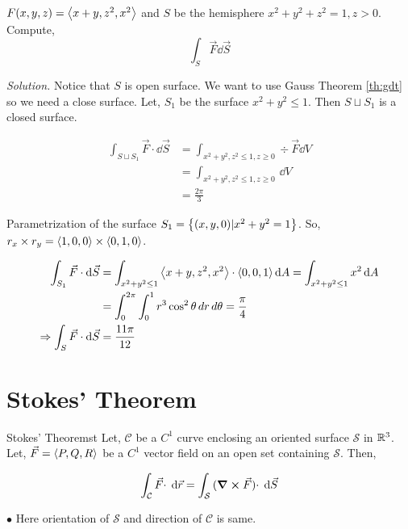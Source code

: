 \documentclass[../Analysis-3]{subfiles}
\begin{document}
\begin{Eg}{}{}
    $F (x,y,z) = \left\langle {x+y}, {z^2,x^2} \right\rangle$ and $S$ be the hemisphere $x^2+y^2+z^2 = 1, z>0$. Compute,
    \[\int_{S} \vec{F} \dd \vec{S}\]

    \textit{Solution.} Notice that $S$ is open surface. We want to  use Gauss Theorem \ref{th:gdt} so we need a close surface. Let, $S_1$ be the surface $x^2 +y^2 \le 1$. Then $S \sqcup S_1$ is a closed surface.

    \begin{align*}
        \int_{S \sqcup S_1} \vec{F}\cdot \dd \vec{S} & = \int_{x^2+y^2,z^2 \le 1, z \ge 0} \div \vec{F} \dd{V} \\
                                                     & = \int_{x^2+y^2,z^2 \le 1, z \ge 0}\,\dd{V}             \\
                                                     & = \frac{2\pi}{3}
    \end{align*}

    Parametrization of the surface $S_1 =\qty{(x,y,0) | x^2+y^2 = 1}$. So, $r_x \times r_y = \left\langle {1,0}, {0} \right\rangle \times \left\langle {0,1}, {0} \right\rangle$.

    \begin{align*}
        \int_{S_1} \vec{F} \cdot \dd \vec{S}           & = \int_{x^2+y^2 \le 1} \left\langle {x+y}, {z^2,x^2} \right\rangle \cdot \left\langle {0,0}, {1} \right\rangle \dd{A} = \int_{x^2+y^2 \le 1} x^2 \dd{A} \\
                                                       & = \int_{0}^{2\pi} \int_{0}^{1} r^3 \cos^2 \theta \,dr \,d\theta = \frac{\pi}{4}                       \\
        \Rightarrow \int_{S} \vec{F} \cdot \dd \vec{S} & = \frac{11\pi}{12}
    \end{align*}
\end{Eg}

\section{Stokes' Theorem}
\begin{Thm}{Stokes' Theorem}{st}
    Let, $\mathcal{C}$ be a $C^1$ curve enclosing an oriented surface $\mathcal{S}$ in $\mathbb{R}^3$. Let,  $\vec{F} = \left\langle {P,Q}, {R} \right\rangle$ be a $C^1$ vector field on an open set containing $\mathcal{S}$. Then,

    \small \[\int_{\mathcal{C}} {\vec{F} \cdot } \hspace{0.1cm} \dd {\vec{r}} = \int_{\mathcal{S}} {(\curl \vec{F}) \cdot} \hspace{0.1cm} \dd {\vec{S}}  \]

    $\bullet$ Here orientation of $\mathcal{S}$ and direction of $\mathcal{C}$ is same.
\end{Thm}
\end{document}
